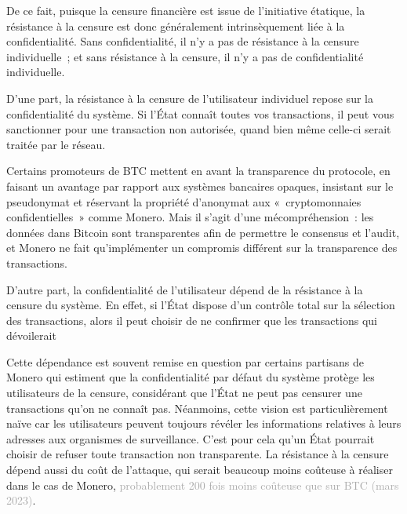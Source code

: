 
De ce fait, puisque la censure financière est issue de l'initiative étatique, la résistance à la censure est donc généralement intrinsèquement liée à la confidentialité. Sans confidentialité, il n'y a pas de résistance à la censure individuelle~; et sans résistance à la censure, il n'y a pas de confidentialité individuelle.

D'une part, la résistance à la censure de l'utilisateur individuel repose sur la confidentialité du système. Si l'État connaît toutes vos transactions, il peut vous sanctionner pour une transaction non autorisée, quand bien même celle-ci serait traitée par le réseau.

Certains promoteurs de BTC mettent en avant la transparence du protocole, en faisant un avantage par rapport aux systèmes bancaires opaques, insistant sur le pseudonymat et réservant la propriété d'anonymat aux «~cryptomonnaies confidentielles~» comme Monero. Mais il s'agit d'une mécompréhension~: les données dans Bitcoin sont transparentes afin de permettre le consensus et l'audit, et Monero ne fait qu'implémenter un compromis différent sur la transparence des transactions.

D'autre part, la confidentialité de l'utilisateur dépend de la résistance à la censure du système. En effet, si l'État dispose d'un contrôle total sur la sélection des transactions, alors il peut choisir de ne confirmer que les transactions qui dévoilerait

Cette dépendance est souvent remise en question par certains partisans de Monero qui estiment que la confidentialité par défaut du système protège les utilisateurs de la censure, considérant que l'État ne peut pas censurer une transactions qu'on ne connaît pas. Néanmoins, cette vision est particulièrement naïve car les utilisateurs peuvent toujours révéler les informations relatives à leurs adresses aux organismes de surveillance. C'est pour cela qu'un État pourrait choisir de refuser toute transaction non transparente. La résistance à la censure dépend aussi du coût de l'attaque, qui serait beaucoup moins coûteuse à réaliser dans le cas de Monero, \textcolor{darkgray}{probablement 200 fois moins coûteuse que sur BTC (mars 2023)}.

